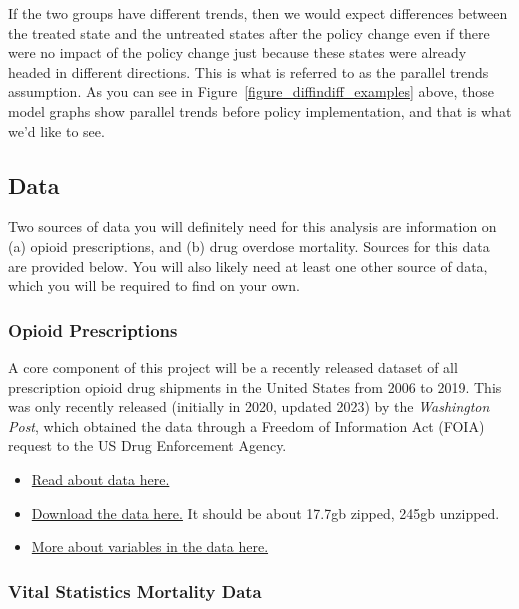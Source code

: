 \documentclass[12pt]{article}
\begin{document}
If the two groups have different trends, then we would expect differences between the treated state and the untreated states after the policy change even if there were no impact of the policy change just because these states were already headed in different directions.  This is what is referred to as the parallel trends assumption. As you can see in Figure~\ref{figure_diffindiff_examples} above, those model graphs show parallel trends before policy implementation, and that is what we'd like to see.



\subsection*{Data}

Two sources of data you will definitely need for this analysis are information on (a) opioid prescriptions, and (b) drug overdose mortality. Sources for this data are provided below. You will also likely need at least one other source of data, which you will be required to find on your own.

\subsubsection*{Opioid Prescriptions}

A core component of this project will be a recently released dataset of all prescription opioid drug shipments in the United States from 2006 to 2019. This was only recently released (initially in 2020, updated 2023) by the \emph{Washington Post}, which obtained the data through a Freedom of Information Act (FOIA) request to the US Drug Enforcement Agency.

\begin{itemize}
  \item \href{https://github.com/nickeubank/practicaldatascience_book/blob/main/ids720_specific/opioids/MoreThan100billionPainPillsSaturatedTheNationOverNineYears.pdf}{Read about data here.}
  \item \href{https://gfx-data.news-engineering.aws.wapo.pub/ne-static/arcos/v2/bulk/arcos_all.zip}{Download the data here.} It should be about 17.7gb zipped, 245gb unzipped.
  \item \href{https://github.com/wpinvestigative/arcos-api/blob/master/data/data_dictionary.csv}{More about variables in the data here.}
\end{itemize}

\subsubsection*{Vital Statistics Mortality Data}
\end{document}
